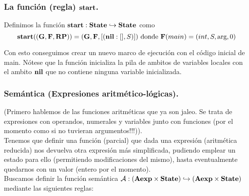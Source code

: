 \subsubsection{La función (regla) $\textbf{start}$.}
Definimos la función $\textbf{start}: \textbf{State} \hookrightarrow \textbf{State}$ como
$$
\textbf{start}((\mathbf{G}, \mathbf{F}, \textbf{RP})) = (\mathbf{G}, \mathbf{F}, [(\textbf{nil}:[], S)]) \text{ donde } \mathbf{F}(main) = (int, S, \text{arg}, 0)
$$

Con esto conseguimos crear un nuevo marco de ejecución con el código inicial de main. Nótese que la función inicializa la pila de ambitos de variables locales con el ambito $\textbf{nil}$ que no contiene ninguna variable inicializada.

\subsubsection{Semántica (Expresiones aritmético-lógicas).}
(Primero hablemos de las funciones aritméticas que ya son jaleo. Se trata de expresiones con operandos, numerales y variables junto con funciones (por el momento como si no tuvieran argumentos!!!)).\\

Tenemos que definir una función (parcial) que dada una expresión (aritmética reducida) nos devuelva otra expresión más simplificada, pudiendo emplear un estado para ello (permitiendo modificaciones del mismo), hasta eventualmente quedarnos con un valor (entero por el momento).\\

Buscamos definir la función semántica $\mathcal{A}: (\textbf{Aexp} \times \textbf{State}) \hookrightarrow (\textbf{Aexp} \times \textbf{State})$ mediante las siguientes reglas:
